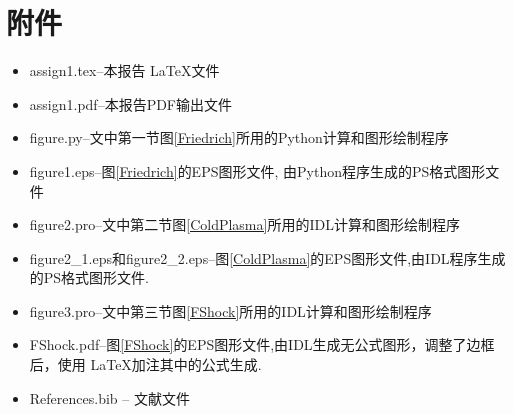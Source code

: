 \documentclass{article}
\begin{document}
	\section{附件}
	
	\begin{itemize}
		\item
		assign1.tex--本报告 \LaTeX 文件
		\item
		assign1.pdf--本报告PDF输出文件
		\item
		figure.py--文中第一节图\ref{Friedrich}所用的Python计算和图形绘制程序
		\item
		figure1.eps--图\ref{Friedrich}的EPS图形文件, 由Python程序生成的PS格式图形文件
		\item
		figure2.pro--文中第二节图\ref{ColdPlasma}所用的IDL计算和图形绘制程序
		\item
		figure2\_1.eps和figure2\_2.eps--图\ref{ColdPlasma}的EPS图形文件,由IDL程序生成的PS格式图形文件.
		\item
		figure3.pro--文中第三节图\ref{FShock}所用的IDL计算和图形绘制程序
		\item
		FShock.pdf--图\ref{FShock}的EPS图形文件,由IDL生成无公式图形，调整了边框后，使用
		\LaTeX 加注其中的公式生成.
		\item
		References.bib -- 文献文件
	\end{itemize}

	
	
	
	
\end{document}
